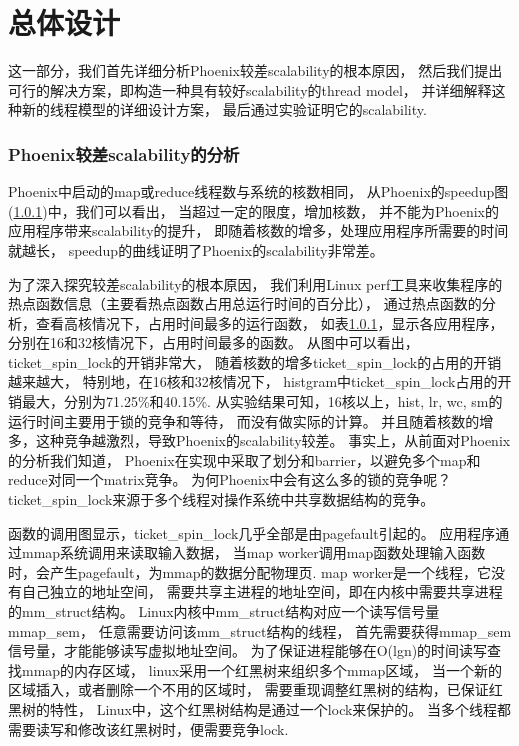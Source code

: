 \section{总体设计}
这一部分，我们首先详细分析Phoenix较差scalability的根本原因，
然后我们提出可行的解决方案，即构造一种具有较好scalability的thread model，
并详细解释这种新的线程模型的详细设计方案，
最后通过实验证明它的scalability.

\subsubsection{Phoenix较差scalability的分析}
Phoenix中启动的map或reduce线程数与系统的核数相同，
从Phoenix的speedup图(\ref{})中，我们可以看出，
当超过一定的限度，增加核数，
并不能为Phoenix的应用程序带来scalability的提升，
即随着核数的增多，处理应用程序所需要的时间就越长，
speedup的曲线证明了Phoenix的scalability非常差。

为了深入探究较差scalability的根本原因，
我们利用Linux perf工具来收集程序的热点函数信息（主要看热点函数占用总运行时间的百分比），
通过热点函数的分析，查看高核情况下，占用时间最多的运行函数，
如表\ref{}，显示各应用程序，分别在16和32核情况下，占用时间最多的函数。
从图中可以看出，ticket\_spin\_lock的开销非常大，
随着核数的增多ticket\_spin\_lock的占用的开销越来越大，
特别地，在16核和32核情况下，
histgram中ticket\_spin\_lock占用的开销最大，分别为71.25\%和40.15\%.
从实验结果可知，16核以上，hist, lr, wc, sm的运行时间主要用于锁的竞争和等待，
而没有做实际的计算。
并且随着核数的增多，这种竞争越激烈，导致Phoenix的scalability较差。
事实上，从前面对Phoenix的分析我们知道，
Phoenix在实现中采取了划分和barrier，以避免多个map和reduce对同一个matrix竞争。
为何Phoenix中会有这么多的锁的竞争呢？
ticket\_spin\_lock来源于多个线程对操作系统中共享数据结构的竞争。

函数的调用图显示，ticket\_spin\_lock几乎全部是由pagefault引起的。
应用程序通过mmap系统调用来读取输入数据，
当map worker调用map函数处理输入函数时，会产生pagefault，为mmap的数据分配物理页.
map worker是一个线程，它没有自己独立的地址空间，
需要共享主进程的地址空间，即在内核中需要共享进程的mm\_struct结构。
Linux内核中mm\_struct结构对应一个读写信号量mmap\_sem，
任意需要访问该mm\_struct结构的线程，
首先需要获得mmap\_sem信号量，才能能够读写虚拟地址空间。
为了保证进程能够在O(lgn)的时间读写查找mmap的内存区域，
linux采用一个红黑树来组织多个mmap区域，
当一个新的区域插入，或者删除一个不用的区域时，
需要重现调整红黑树的结构，已保证红黑树的特性，
Linux中，这个红黑树结构是通过一个lock来保护的。
当多个线程都需要读写和修改该红黑树时，便需要竞争lock.


